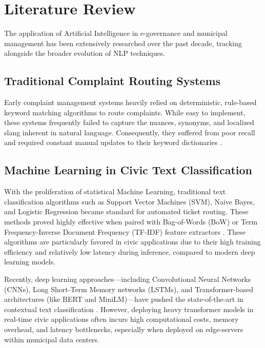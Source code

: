 \documentclass[conference]{IEEEtran}
\begin{document}
\section{Literature Review}

The application of Artificial Intelligence in e-governance and municipal management has been extensively researched over the past decade, tracking alongside the broader evolution of NLP techniques.

\subsection{Traditional Complaint Routing Systems}
Early complaint management systems heavily relied on deterministic, rule-based keyword matching algorithms to route complaints. While easy to implement, these systems frequently failed to capture the nuances, synonyms, and localized slang inherent in natural language. Consequently, they suffered from poor recall and required constant manual updates to their keyword dictionaries \cite{b1,b2}. 

\subsection{Machine Learning in Civic Text Classification}
With the proliferation of statistical Machine Learning, traditional text classification algorithms such as Support Vector Machines (SVM), Naive Bayes, and Logistic Regression became standard for automated ticket routing. These methods proved highly effective when paired with Bag-of-Words (BoW) or Term Frequency-Inverse Document Frequency (TF-IDF) feature extractors \cite{b4,b5}. These algorithms are particularly favored in civic applications due to their high training efficiency and relatively low latency during inference, compared to modern deep learning models. 

Recently, deep learning approaches—including Convolutional Neural Networks (CNNs), Long Short-Term Memory networks (LSTMs), and Transformer-based architectures (like BERT and MiniLM)—have pushed the state-of-the-art in contextual text classification \cite{b8}. However, deploying heavy transformer models in real-time civic applications often incurs high computational costs, memory overhead, and latency bottlenecks, especially when deployed on edge-servers within municipal data centers.
\end{document}
